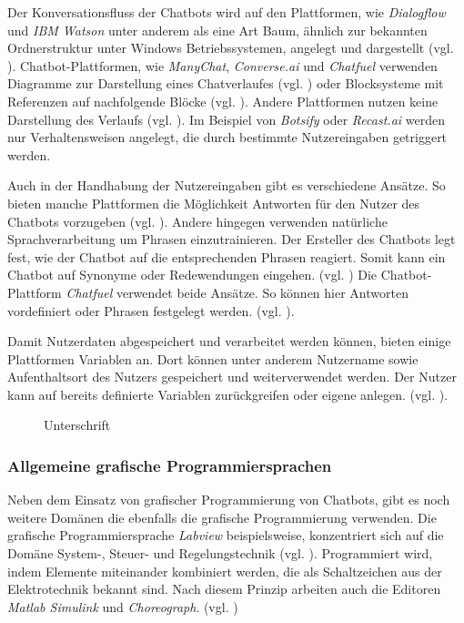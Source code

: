 Der Konversationsfluss der Chatbots wird auf den Plattformen, wie \emph{Dialogflow} und \emph{IBM Watson} unter anderem als eine Art Baum, ähnlich zur bekannten Ordnerstruktur unter Windows Betriebssystemen, angelegt und dargestellt (vgl. \cite{Dialogfl40:online} \cite{KatalogI56:online}). Chatbot-Plattformen, wie \emph{ManyChat}, \emph{Converse.ai} und \emph{Chatfuel} verwenden Diagramme zur Darstellung eines Chatverlaufes (vgl. \cite{Converse15:online} \cite{WelcomeM66:online}) oder Blocksysteme mit Referenzen auf nachfolgende Blöcke (vgl. \cite{Chatfuel3:online}). Andere Plattformen nutzen keine Darstellung des Verlaufs (vgl. \cite{BotsifyC64:online}). Im Beispiel von \emph{Botsify} oder \emph{Recast.ai} werden nur Verhaltensweisen angelegt, die durch bestimmte Nutzereingaben getriggert werden. 

Auch in der Handhabung der Nutzereingaben gibt es verschiedene Ansätze. So bieten manche Plattformen die Möglichkeit Antworten für den Nutzer des Chatbots vorzugeben (vgl. \cite{Chatfuel3:online} \cite{WelcomeM66:online}). Andere hingegen verwenden natürliche Sprachverarbeitung um Phrasen einzutrainieren. Der Ersteller des Chatbots legt fest, wie der Chatbot auf die entsprechenden Phrasen reagiert. Somit kann ein Chatbot auf Synonyme oder Redewendungen eingehen. (vgl. \cite{BotsifyC64:online} \cite{Dialogfl40:online} \cite{KatalogI56:online}) Die Chatbot-Plattform \emph{Chatfuel} verwendet beide Ansätze. So können hier Antworten vordefiniert oder Phrasen festgelegt werden. (vgl. \cite{Chatfuel3:online}). 

Damit Nutzerdaten abgespeichert und verarbeitet werden können, bieten einige Plattformen Variablen an. Dort können unter anderem Nutzername sowie Aufenthaltsort des Nutzers gespeichert und weiterverwendet werden. Der Nutzer kann auf bereits definierte Variablen zurückgreifen oder eigene anlegen. (vgl. \cite{Chatfuel3:online} \cite{Converse15:online} \cite{Dialogfl40:online} \cite{KatalogI56:online} \cite{WelcomeM66:online}). 

\begin{figure}[h]
\centering
{}
\caption{Unterschrift}
\label{methVorgehen}
\end{figure}

\subsubsection{Allgemeine grafische Programmiersprachen}

Neben dem Einsatz von grafischer Programmierung von Chatbots, gibt es noch weitere Domänen die ebenfalls die grafische Programmierung verwenden. Die grafische Programmiersprache \emph{Labview} beispielsweise, konzentriert sich auf die Domäne System-, Steuer- und Regelungstechnik (vgl. \cite{WasistLa94:online}). Programmiert wird, indem Elemente miteinander kombiniert werden, die als Schaltzeichen aus der Elektrotechnik bekannt sind. Nach diesem Prinzip arbeiten auch die Editoren \emph{Matlab Simulink} und \emph{Choreograph}. (vgl. \cite{Choregra47:online} \cite{Simulink28:online})

